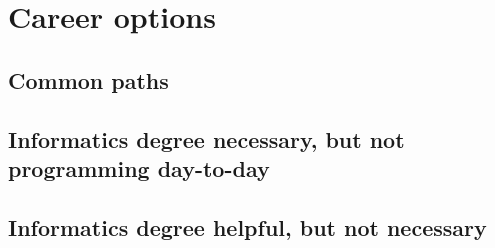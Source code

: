 \chapter{Career options}
\section{Common paths}
\section{Informatics degree necessary, but not programming day-to-day}
\section{Informatics degree helpful, but not necessary}
